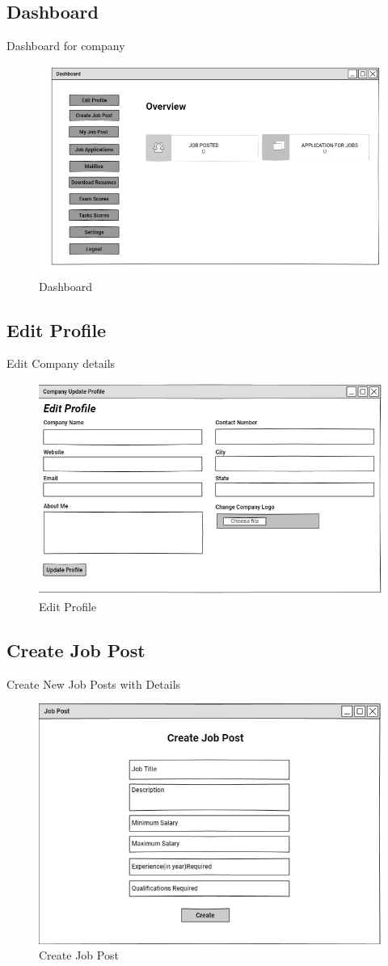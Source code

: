 \documentclass[a4paper,12pt]{report}
\begin{document}
\subsection {Dashboard}
Dashboard for company
\begin{figure}[bph]
	\centering
	\includegraphics[width=1\linewidth]{img/company/company_home_page}
	\caption{Dashboard}
\end{figure}

\pagebreak
\subsection {Edit Profile}
Edit Company details
\begin{figure}[bph]
	\centering
	\includegraphics[width=.6\linewidth]{img/company/cmpnyprflupdt}
		\caption{Edit Profile}
\end{figure}

\subsection {Create Job Post}
Create New Job Posts with Details
\begin{figure}[bph]
	\centering
	\includegraphics[width=.6\linewidth]{img/company/createpostjob}
	\caption{Create Job Post}
\end{figure}
\pagebreak
\end{document}
